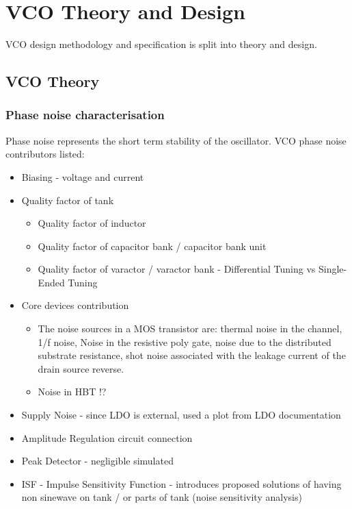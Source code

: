 \section{VCO Theory and Design}

VCO design methodology and specification is split into theory and design.


\subsection{VCO Theory}


\subsubsection*{Phase noise characterisation}

Phase noise represents the short term stability of the oscillator. VCO phase noise contributors listed:

\begin{itemize}
	\item Biasing - voltage and current %
	\item Quality factor of tank %
	\begin{itemize}
		\item Quality factor of inductor
		\item Quality factor of capacitor bank / capacitor bank unit %
		\item Quality factor of varactor / varactor bank - Differential Tuning vs Single-Ended Tuning 
	\end{itemize}
	\item Core devices contribution 
	\begin{itemize}
		\item The noise sources in a MOS transistor are: thermal noise in the channel, 1/f noise, Noise in the resistive poly gate, noise due to the distributed substrate resistance, shot noise associated with the leakage current of the drain source reverse.
		\item Noise in HBT !?
	\end{itemize}
	\item Supply Noise - since LDO is external, used a plot from LDO documentation 
	\item Amplitude Regulation circuit connection
	\item Peak Detector - negligible simulated 
	\item ISF - Impulse Sensitivity Function - introduces proposed solutions of having non sinewave on tank / or parts of tank (noise sensitivity analysis)
\end{itemize}


